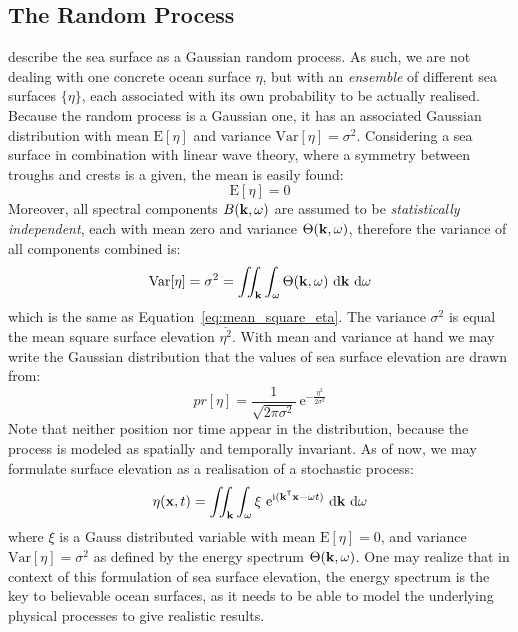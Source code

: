\subsection{The Random Process}
\label{sec:random_process}
\citet{Neumann:1966} describe the sea surface as a Gaussian random process.
As such, we are not dealing with one concrete ocean surface $\eta$, but with an
\emph{ensemble} of different sea surfaces $\{\eta\}$, each associated with its
own probability to be actually realised. Because the random process is a
Gaussian one, it has an associated Gaussian distribution with mean
$\mathrm{E}[\eta]$ and variance $\mathrm{Var}[\eta] = \sigma^2$. Considering a
sea surface in combination with linear wave theory, where a symmetry between
troughs and crests is a given, the mean is easily found:
\begin{equation*}
 \mathrm{E}[\eta] = 0
\end{equation*}
%
Moreover, all spectral components $B(\mathbf{k},\omega)$ are assumed to be
\emph{statistically independent}, each with mean zero and variance $\Theta(\mathbf{k},\omega)$,
therefore the variance of all components combined is:
\begin{equation*}
\label{eq:random_process_variance}
\mathrm{Var}[\eta] = \sigma^2 = \iint_{\mathbf{k}}
\int_{\omega}\Theta(\mathbf{k},\omega)~\mathrm{d}\mathbf{k}~\mathrm{ d}\omega
\end{equation*}
which is the same as Equation~\ref{eq:mean_square_eta}. The variance
$\sigma^2$ is equal the mean square surface elevation $\overline{\eta^2}$. With
mean and variance at hand we may write the Gaussian distribution that the
values of sea surface elevation are drawn from:
\begin{equation}
\label{eq:gaussian_dist}
 pr[\eta] = \frac{1}{\sqrt{2\pi\sigma^2}}~\mathrm{e}^{-\frac{\eta^2}{2\sigma^2}}
\end{equation}
Note that neither position nor time appear in the distribution, because the
process is modeled as spatially and temporally invariant.
As of now, we may formulate surface elevation as a realisation of a stochastic process:
\begin{equation}
\label{eq:surface_elevation_gauss}
 \eta(\mathbf{x}, t) = \iint_{\mathbf{k}}\int_{\omega} \xi
~\mathrm{e}^{\mathrm{i}(\mathbf{k}^{\mathsf{T}}\mathbf{x}-
\omega t)}~
\mathrm{d}\mathbf{k}~\mathrm{d}\omega
\end{equation}
where $\xi$ is a Gauss distributed variable with mean $\mathrm{E}[\eta] = 0$,
and variance $\mathrm{Var}[\eta] = \sigma^2$ as defined by the energy spectrum
$\Theta(\mathbf{k}, \omega)$. One may realize that in context of this formulation
of sea surface elevation, the energy spectrum is the key to believable
ocean surfaces, as it needs to be able to model the underlying physical
processes to give realistic results.\\

